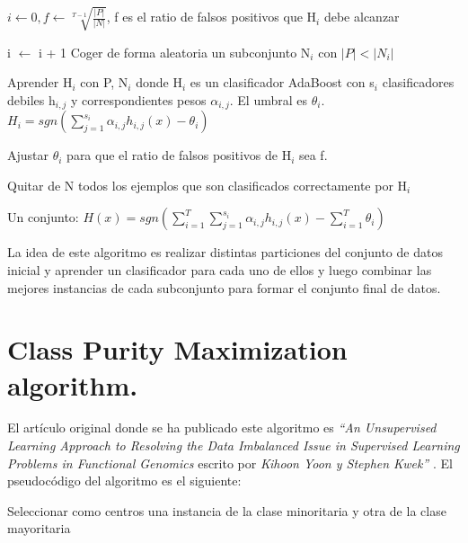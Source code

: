 \begin{codigo}
\begin{algorithmic}[1]
\State \parbox[t]{305pt}{$i \leftarrow 0, f \leftarrow \sqrt[T-1]{\frac{\left | P \right |}{\left | N \right |}}$, f es el ratio de falsos positivos que H$_i$ debe alcanzar\strut}
\State i $\leftarrow$ i + 1
\State Coger de forma aleatoria un subconjunto N$_i$ con $\left | P \right | < \left | N_i \right |$
\State \parbox[t]{305pt}{Aprender H$_i$ con P, N$_i$ donde H$_i$ es un clasificador AdaBoost con s$_i$ clasificadores debiles h$_{i, j}$ y correspondientes pesos $\alpha_{i, j}$. El umbral es $\theta_i$. $H_i = sgn(\sum_{j=1}^{s_i} \alpha_{i, j} h_{i, j}(x) - \theta_i)$\strut}
\State Ajustar $\theta_i$ para que el ratio de falsos positivos de H$_i$ sea f.
\State \parbox[t]{305pt}{Quitar de N todos los ejemplos que son clasificados correctamente por H$_i$\strut}
\EndWhile
\State \Return Un conjunto: $H(x) = sgn(\sum_{i=1}^{T} \sum_{j=1}^{s_i} \alpha_{i, j} h_{i, j}(x) - \sum_{i=1}^{T} \theta_i)$
\EndFunction 
\end{algorithmic}
\end{codigo}

La idea de este algoritmo es realizar distintas particiones del conjunto de datos inicial y aprender un clasificador para cada uno de ellos y luego combinar las mejores instancias de cada subconjunto para formar el conjunto final de datos.

\section{Class Purity Maximization algorithm.} \label{sec:alg_cpm}
El artículo original donde se ha publicado este algoritmo es \textit{``An Unsupervised Learning Approach to Resolving the Data Imbalanced Issue in Supervised Learning Problems in Functional Genomics} escrito por \textit{Kihoon Yoon y Stephen Kwek''} \cite{cpm}. El pseudocódigo del algoritmo es el siguiente:

\begin{codigo}
\begin{algorithmic}[1]
\State \parbox[t]{305pt}{Seleccionar como centros una instancia de la clase minoritaria y otra de la clase mayoritaria\strut}
\end{algorithmic}
\end{codigo}
	
